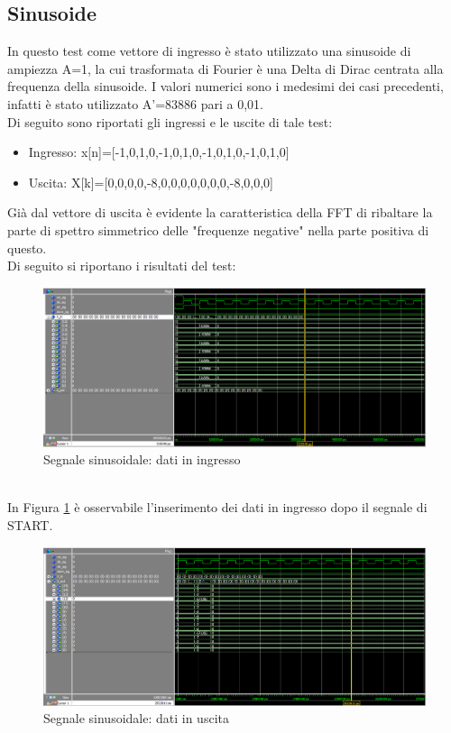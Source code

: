 \documentclass[a4paper, titlepage]{article}
\begin{document}
\subsection{Sinusoide}
In questo test come vettore di ingresso è stato utilizzato una sinusoide di ampiezza A=1, la cui trasformata di Fourier è una Delta di Dirac centrata alla frequenza della sinusoide. I valori numerici sono i medesimi dei casi precedenti, infatti è stato utilizzato A'=83886 pari a 0,01.\\Di seguito sono riportati gli ingressi e le uscite di tale test:
\begin{itemize}
    \item Ingresso: x[n]=[-1,0,1,0,-1,0,1,0,-1,0,1,0,-1,0,1,0]
    \item Uscita:   X[k]=[0,0,0,0,-8,0,0,0,0,0,0,0,-8,0,0,0]
\end{itemize}
Già dal vettore di uscita è evidente la caratteristica della FFT di ribaltare la parte di spettro simmetrico delle "frequenze negative" nella parte positiva di questo.\\Di seguito si riportano i risultati del test:
\begin{figure}[h]
    \centering
    \includegraphics[scale=0.45]{test_sin/fs_sin_in.png}
    \caption{Segnale sinusoidale: dati in ingresso}
    \label{fig:sin_in}
\end{figure}\\
In Figura \ref{fig:sin_in} è osservabile l'inserimento dei dati in ingresso dopo il segnale di START.
\pagebreak
\begin{figure}[h]
    \centering
    \includegraphics[scale=0.45]{test_sin/fs_sin_out.png}
    \caption{Segnale sinusoidale: dati in uscita}
    \label{fig:sin_out}
\end{figure}\\
\end{document}
